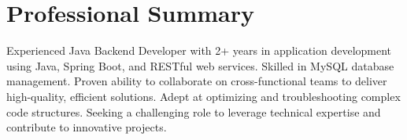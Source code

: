 \section{Professional Summary}
Experienced Java Backend Developer with 2+ years in application development using Java, Spring Boot, and RESTful web services. Skilled in MySQL database management. Proven ability to collaborate on cross-functional teams to deliver high-quality, efficient solutions. Adept at optimizing and troubleshooting complex code structures. Seeking a challenging role to leverage technical expertise and contribute to innovative projects.